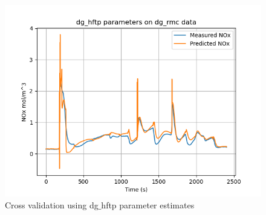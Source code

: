 \begin{figure}[H]
\begin{minipage}{0.3\textwidth}
                \includegraphics[width = \textwidth]{./figs/figs_new_mdl/dg_hftp_dg_rmc.png}
        \end{minipage}
        \caption{Cross validation using dg$\_$hftp parameter estimates}
\end{figure}


